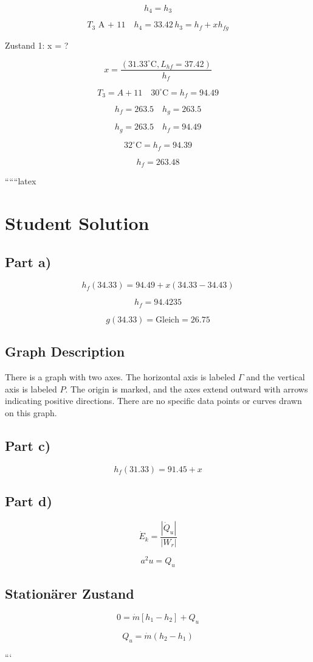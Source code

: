 \[
h_4 = h_3
\]

\[
T_3 \text{ A + 11} \quad h_4 = 33.42 \, h_3 = h_f + x h_{fg}
\]

Zustand 1: \quad x = ?

\[
x = \frac{(31.33^\circ \text{C}, L_{hf} = 37.42)}{h_f}
\]

\[
T_3 = A + 11 \quad 30^\circ \text{C} = h_f = 94.49
\]

\[
h_f = 263.5 \quad h_g = 263.5
\]

\[
h_g = 263.5 \quad h_f = 94.49
\]

\[
32^\circ \text{C} = h_f = 94.39
\]

\[
h_f = 263.48
\]

``````latex


\section*{Student Solution}

\subsection*{Part a)}

\[
h_f(34.33) = 94.49 + x \left(34.33 - 34.43\right)
\]

\[
h_f = 94.4235
\]

\[
g(34.33) = \text{Gleich} = 26.75
\]

\subsection*{Graph Description}

There is a graph with two axes. The horizontal axis is labeled $\Gamma$ and the vertical axis is labeled $P$. The origin is marked, and the axes extend outward with arrows indicating positive directions. There are no specific data points or curves drawn on this graph.

\subsection*{Part c)}

\[
h_f(31.33) = 91.45 + x
\]

\subsection*{Part d)}

\[
\dot{E}_k = \frac{\left| \dot{Q}_u \right|}{\left| W_r \right|}
\]

\[
a^2 u = Q_u
\]

\subsection*{Stationärer Zustand}

\[
0 = \dot{m} \left[ h_1 - h_2 \right] + Q_u
\]

\[
Q_u = \dot{m} \left( h_2 - h_1 \right)
\]

```